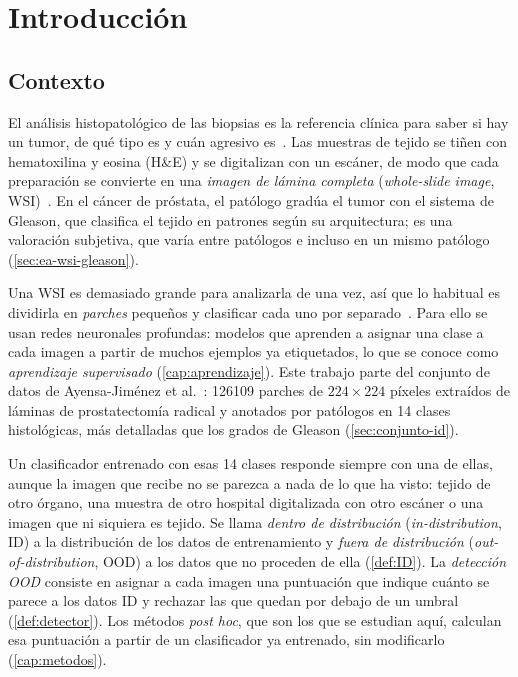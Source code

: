 %

\chapter{Introducción}\label{cap:introduccion}


\section{Contexto}\label{sec:contexto}

El análisis histopatológico de las biopsias es la referencia clínica para saber si hay un tumor, de qué tipo es y cuán agresivo es~\cite{ayensa2026}. Las muestras de tejido se tiñen con hematoxilina y eosina (H\&E) y se digitalizan con un escáner, de modo que cada preparación se convierte en una \emph{imagen de lámina completa} (\emph{whole-slide image}, WSI)~\cite{ayensa2026}. En el cáncer de próstata, el patólogo gradúa el tumor con el sistema de Gleason, que clasifica el tejido en patrones según su arquitectura; es una valoración subjetiva, que varía entre patólogos e incluso en un mismo patólogo~\cite{bulten2022} (\cref{sec:ea-wsi-gleason}).

Una WSI es demasiado grande para analizarla de una vez, así que lo habitual es dividirla en \emph{parches} pequeños y clasificar cada uno por separado~\cite{ayensa2026}. Para ello se usan redes neuronales profundas: modelos que aprenden a asignar una clase a cada imagen a partir de muchos ejemplos ya etiquetados, lo que se conoce como \emph{aprendizaje supervisado} (\cref{cap:aprendizaje}). Este trabajo parte del conjunto de datos de Ayensa-Jiménez et al.~\cite{ayensa2026}: \num{126109} parches de $224 \times 224$ píxeles extraídos de láminas de prostatectomía radical y anotados por patólogos en 14 clases histológicas, más detalladas que los grados de Gleason (\cref{sec:conjunto-id}).

Un clasificador entrenado con esas 14 clases responde siempre con una de ellas, aunque la imagen que recibe no se parezca a nada de lo que ha visto: tejido de otro órgano, una muestra de otro hospital digitalizada con otro escáner o una imagen que ni siquiera es tejido. Se llama \emph{dentro de distribución} (\emph{in-distribution}, ID) a la distribución de los datos de entrenamiento y \emph{fuera de distribución} (\emph{out-of-distribution}, OOD) a los datos que no proceden de ella (\cref{def:ID}). La \emph{detección OOD} consiste en asignar a cada imagen una puntuación que indique cuánto se parece a los datos ID y rechazar las que quedan por debajo de un umbral (\cref{def:detector}). Los métodos \emph{post hoc}, que son los que se estudian aquí, calculan esa puntuación a partir de un clasificador ya entrenado, sin modificarlo (\cref{cap:metodos}).


